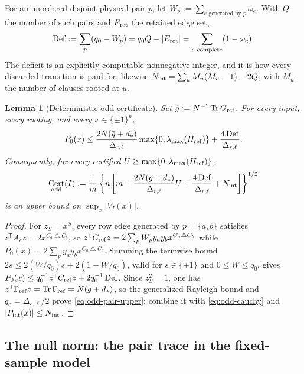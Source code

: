 \documentclass[11pt]{article}
\newtheorem{lemma}[lemma]{Lemma}
\theoremstyle{definition}
\theoremstyle{remark}
\newcommand{\1}{\mathbf 1}
\newcommand{\sd}{\mathbin{\triangle}}
\DeclareMathOperator{\Tr}{Tr}
\DeclareMathOperator{\Cert}{Cert}
\DeclareMathOperator{\Def}{Def}
\numberwithin{equation}{section}
\begin{document}
For an unordered disjoint physical pair $p$, let
$W_p:=\sum_{e\text{ generated by }p}\omega_e$.  With $Q$ the number of
such pairs and $E_{\rm ret}$ the retained edge set,
\begin{equation}\label{eq:hard-deficit}
 \Def:=\sum_p(q_0-W_p)
 =q_0Q-|E_{\rm ret}|
 =\sum_{e\text{ complete}}(1-\omega_e).
\end{equation}
The deficit is an explicitly computable nonnegative integer, and it is
how every discarded transition is paid for; likewise
$N_{\rm int}=\sum_uM_u(M_u-1)-2Q$, with $M_u$ the number of clauses
rooted at $u$.

\begin{lemma}[Deterministic odd certificate]\label{lem:odd-cert}
Set $\bar g:=N^{-1}\Tr G_{\rm ref}$.  For every input, every rooting,
and every $x\in\{\pm1\}^n$,
\begin{equation}\label{eq:odd-pair-upper}
 P_0(x)\le
 \frac{2N(\bar g+d_*)}{\Delta_{r,\ell}}
 \max\{0,\lambda_{\max}(H_{\rm ref})\}
 +\frac{4\Def}{\Delta_{r,\ell}}.
\end{equation}
Consequently, for every certified
$U\ge\max\{0,\lambda_{\max}(H_{\rm ref})\}$,
\begin{equation}\label{eq:odd-cert-value}
 \Cert_{\rm odd}(I):=\frac1m\left\{n\left[
 m+\frac{2N(\bar g+d_*)}{\Delta_{r,\ell}}U
 +\frac{4\Def}{\Delta_{r,\ell}}+N_{\rm int}
 \right]\right\}^{1/2}
\end{equation}
is an upper bound on $\sup_x|V_I(x)|$.
\end{lemma}
\begin{proof}
For $z_S=x^S$, every row edge generated by $p=\{a,b\}$ satisfies
$z^{\mathsf T}A_ez=2x^{C_a\sd C_b}$, so
$z^{\mathsf T}C_{\rm ref}z=2\sum_pW_py_ay_bx^{C_a\sd C_b}$ while
$P_0(x)=2\sum_py_ay_bx^{C_a\sd C_b}$.  Summing the termwise bound
$2s\le2(W/q_0)s+2(1-W/q_0)$, valid for $s\in\{\pm1\}$ and
$0\le W\le q_0$, gives
$P_0(x)\le q_0^{-1}z^{\mathsf T}C_{\rm ref}z+2q_0^{-1}\Def$.  Since
$z_S^2=1$, one has
$z^{\mathsf T}\Gamma_{\rm ref}z=\Tr\Gamma_{\rm ref}=N(\bar g+d_*)$, so
the generalized Rayleigh bound and $q_0=\Delta_{r,\ell}/2$ prove
\cref{eq:odd-pair-upper}; combine it with \cref{eq:odd-cauchy} and
$|P_{\rm int}(x)|\le N_{\rm int}$.
\end{proof}

\subsection{The null norm: the pair trace in the fixed-sample model}
\end{document}
